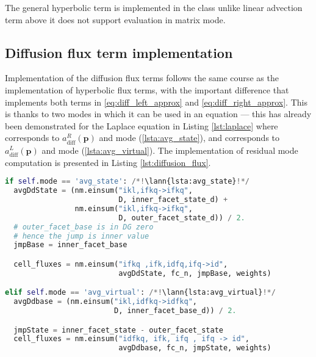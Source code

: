 The general hyperbolic term is implemented in the class
 unlike linear advection term above it does not 
support evaluation in matrix mode.



\subsection{Diffusion flux term implementation}
\label{se:diff_flux_term_imp}

Implementation of the diffusion flux terms follows the same course as the implementation 
of hyperbolic flux terms, with the important difference that 
implements both terms in \eqref{eq:diff_left_approx} and \eqref{eq:diff_right_approx}. 
This is thanks to two modes in which it can be used in an equation --- this has already 
been demonstrated for the Laplace equation in Listing \ref{lst:laplace} where 
 corresponds to $a^R_\mathrm{diff}(\mathbf{p})$ and mode 
(\ref{lsta:avg_state}), and 
corresponds to $a^L_\mathrm{diff}(\mathbf{p})$ and mode 
(\ref{lsta:avg_virtual}). The implementation of residual mode computation is presented in 
Listing \ref{lst:diffusion_flux}.
\setcounter{lstannotation}{0}
\begin{lstlisting}[language=Python, caption=Computation of diffusion cell
fluxes. \label{lst:diffusion_flux}]
if self.mode == 'avg_state': /*!\lann{lsta:avg_state}!*/
  avgDdState = (nm.einsum("ikl,ifkq->ifkq",
                          D, inner_facet_state_d) +
                nm.einsum("ikl,ifkq->ifkq",
                          D, outer_facet_state_d)) / 2.
  # outer_facet_base is in DG zero
  # hence the jump is inner value
  jmpBase = inner_facet_base

  cell_fluxes = nm.einsum("ifkq ,ifk,idfq,ifq->id",
                          avgDdState, fc_n, jmpBase, weights)

elif self.mode == 'avg_virtual': /*!\lann{lsta:avg_virtual}!*/
  avgDdbase = (nm.einsum("ikl,idfkq->idfkq",
                         D, inner_facet_base_d)) / 2.

  jmpState = inner_facet_state - outer_facet_state
  cell_fluxes = nm.einsum("idfkq, ifk, ifq , ifq -> id",
                          avgDdbase, fc_n, jmpState, weights)
\end{lstlisting}


